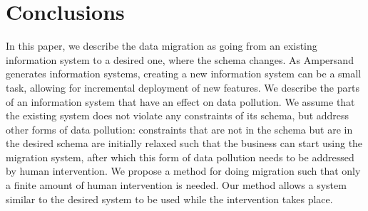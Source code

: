 \documentclass[runningheads]{llncs}
\begin{document}
%
%
%
%

\section{Conclusions}

In this paper, we describe the data migration as going from an existing information system to a desired one, where the schema changes.
As Ampersand generates information systems, creating a new information system can be a small task, allowing for incremental deployment of new features.
We describe the parts of an information system that have an effect on data pollution.
We assume that the existing system does not violate any constraints of its schema, but address other forms of data pollution:
constraints that are not in the schema but are in the desired schema are initially relaxed such that the business can start using the migration system, after which this form of data pollution needs to be addressed by human intervention.
We propose a method for doing migration such that only a finite amount of human intervention is needed.
Our method allows a system similar to the desired system to be used while the intervention takes place.
\end{document}
